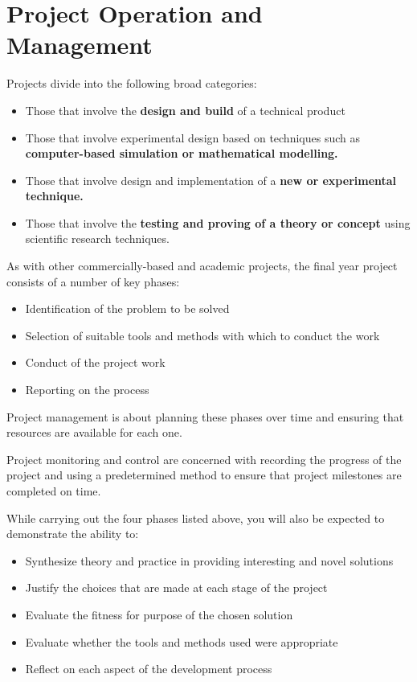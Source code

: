 \chapter{Project Operation and Management}

Projects divide into the following broad categories:

\begin{itemize}
    \item Those that involve the \textbf{design and build} of a technical product
    \item Those that involve experimental design based on techniques such as \textbf{computer-based simulation or mathematical modelling.}
    \item Those that involve design and implementation of a \textbf{new or experimental technique.}
    \item Those that involve the \textbf{testing and proving of a theory or concept} using scientific research techniques. 
\end{itemize}

As with other commercially-based and academic projects, the final year project consists of a number of key phases: 

\begin{itemize}
    \item Identification of the problem to be solved
    \item Selection of suitable tools and methods with which to conduct the work
    \item Conduct of the project work
    \item Reporting on the process
\end{itemize}

Project management is about planning these phases over time and ensuring that resources are available for each one.

Project monitoring and control are concerned with recording the progress of the project and using a predetermined method to ensure that project milestones are completed on time.

While carrying out the four phases listed above, you will also be expected to demonstrate the ability to:

\begin{itemize}
    \item Synthesize theory and practice in providing interesting and novel solutions
    \item Justify the choices that are made at each stage of the project
    \item Evaluate the fitness for purpose of the chosen solution
    \item Evaluate whether the tools and methods used were appropriate
    \item Reflect on each aspect of the development process
\end{itemize}

